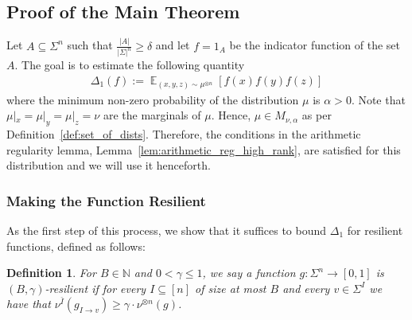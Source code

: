 \documentclass[10pt,a4paper]{amsart}
\newtheorem{definition}[thm]{Definition}
\newcommand\Expect[2]{{\mathop{\mathbb{E}}_{#1}\left[ {#2} \right]}}
\renewcommand\geq{\geqslant}
\renewcommand\leq{\leqslant}
\newcommand{\V}[1]{{#1}}
\begin{document}
\subsection{Proof of the Main Theorem}
Let $A\subseteq \Sigma^n$ such that $\frac{|A|}{|\Sigma|^n}\geq \delta$ and let $f=1_A$ be the indicator function of the set $A$. The goal is to estimate the following quantity
\begin{align*}
    \Delta_1(f) := \Expect{(\V x, \V y, \V z)\sim \mu^{\otimes n}}{f(\V x) f(\V y) f(\V z)}
\end{align*}
where the minimum non-zero probability of the distribution $\mu$ is $\alpha>0$. 
Note that $\mu|_{x} = \mu|_{y} = \mu|_{z} = \nu$ are the marginals of $\mu$. Hence, $\mu\in M_{\nu,\alpha}$ as per Definition~\ref{def:set_of_dists}. Therefore, the conditions in the arithmetic regularity lemma, Lemma~\ref{lem:arithmetic_reg_high_rank}, are satisfied for this distribution and we will use it henceforth.




\subsubsection{Making the Function Resilient}

As the first step of this process, we show that it suffices to bound $\Delta_1$ for resilient functions, defined as follows:

\begin{definition}
   For $B\in \mathbb{N}$ and $0< \gamma\leq 1$, we say a function $g\colon \Sigma^n\to [0,1]$ is $(B,\gamma)$-resilient if
    for every $I\subseteq [n]$ of size at most $B$ and 
    every  $v\in \Sigma^{I}$ we have that $\nu^{\bar{I}}(g_{I\rightarrow v})\geq \gamma\cdot \nu^{\otimes n}(g)$.
\end{definition}
\end{document}

